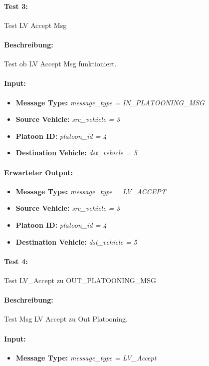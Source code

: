 \documentclass[a4paper, 12pt, titlepage]{scrartcl}
\begin{document}
{			\paragraph{Test 3:}{Test LV Accept Msg}
			\paragraph{Beschreibung:} Test ob LV Accept Msg funktioniert.
			\paragraph{Input:}
			\begin{itemize} \itemsep-0.5em
				\item \textbf{Message Type:} \emph{message\_type = IN\_PLATOONING\_MSG}
				\item \textbf{Source Vehicle:} \emph{src\_vehicle = 3}
				\item \textbf{Platoon ID:} \emph{platoon\_id = 4}
				\item \textbf{Destination Vehicle:} \emph{dst\_vehicle = 5}
			\end{itemize}
			\paragraph{Erwarteter Output:}
			\begin{itemize} \itemsep-0.5em
				\item \textbf{Message Type:} \emph{message\_type = LV\_ACCEPT}
				\item \textbf{Source Vehicle:} \emph{src\_vehicle = 3}
				\item \textbf{Platoon ID:} \emph{platoon\_id = 4}
				\item \textbf{Destination Vehicle:} \emph{dst\_vehicle = 5}
			\end{itemize}

			\paragraph{Test 4:}{Test LV\_Accept zu OUT\_PLATOONING\_MSG}
			\paragraph{Beschreibung:} Test Msg LV Accept zu Out Platooning.
			\paragraph{Input:}
			\begin{itemize} \itemsep-0.5em
				\item \textbf{Message Type:} \emph{message\_type = LV\_Accept}


\end{itemize}}
\end{document}
